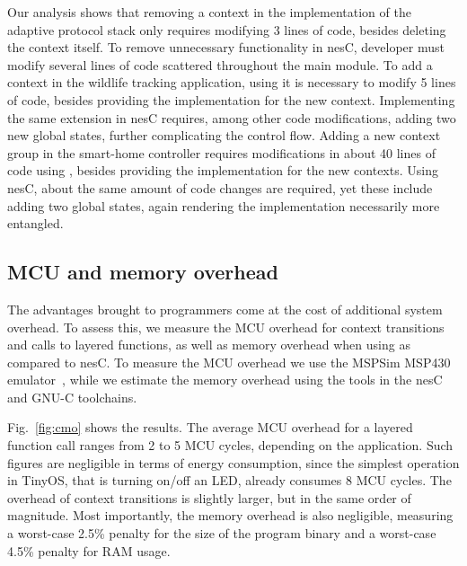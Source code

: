  Our analysis shows that removing a context in the
\conesc implementation of the adaptive protocol stack only requires
modifying 3 lines of code, besides deleting the context itself. To
remove unnecessary functionality in nesC, developer must modify
several lines of code scattered throughout the main module. To add a
context in the wildlife tracking application, using \conesc it is
necessary to modify 5 lines of code, besides providing the
implementation for the new context. Implementing the same extension in
nesC requires, among other code modifications, adding two new global
states, further complicating the control flow. Adding a new context
group in the smart-home controller requires modifications in about 40
lines of code using \conesc, besides providing the implementation for
the new contexts. Using nesC, about the same amount of code changes
are required, yet these include adding two global states, again
rendering the implementation necessarily more entangled.


\subsection{MCU and memory overhead}\label{sec:overhead}

The advantages brought to programmers come at the cost of additional
system overhead. To assess this, we measure the MCU overhead for
context transitions and calls to layered functions, as well as memory
overhead when using \conesc as compared to nesC. To measure the MCU
overhead we use the MSPSim MSP430 emulator~\cite{eriksson09}, while we
estimate the memory overhead using the tools in the nesC and GNU-C
toolchains.


 Fig.~\ref{fig:cmo} shows the results. The average MCU overhead for a layered function
call ranges from 2 to 5 MCU cycles, depending on the application. Such figures
are negligible in terms of energy consumption, since the simplest operation in
TinyOS, that is turning on/off an LED, already consumes 8 MCU cycles. The
overhead of context transitions is slightly larger, but in the same order of
magnitude. Most importantly, the memory overhead is also negligible, measuring a
worst-case 2.5\% penalty for the size of the program binary and a worst-case
4.5\% penalty for RAM usage.

